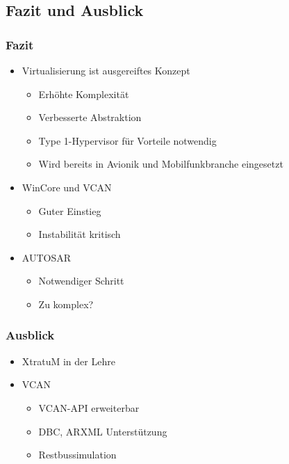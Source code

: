 \documentclass[]{beamer}
\begin{document}
\subsection{Fazit und Ausblick}
\begin{frame}
\frametitle{Fazit}
    \begin{itemize}
        \item Virtualisierung ist ausgereiftes Konzept
        \begin{itemize}
            \item Erhöhte Komplexität
            \item Verbesserte Abstraktion
            \item Type 1-Hypervisor für Vorteile notwendig
            \item Wird bereits in Avionik und Mobilfunkbranche eingesetzt
        \end{itemize}
        \item WinCore und VCAN
        \begin{itemize}
            \item Guter Einstieg
            \item Instabilität kritisch
        \end{itemize}
        \item AUTOSAR
        \begin{itemize}
            \item Notwendiger Schritt
            \item Zu komplex?
        \end{itemize}
    \end{itemize}
\end{frame}

\begin{frame}
\frametitle{Ausblick}
    \begin{itemize}
        \item XtratuM in der Lehre
        \item VCAN
        \begin{itemize}
            \item VCAN-API erweiterbar
            \item DBC, ARXML Unterstützung
            \item Restbussimulation
        \end{itemize}
    \end{itemize}
\end{frame}

\bgroup
    \begin{frame}[plain]{}
    \end{frame}
\egroup
\end{document}
